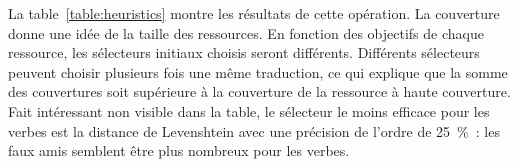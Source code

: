
La table~\ref{table:heuristics} montre les résultats de cette opération. La couverture donne une idée de la taille des ressources. En fonction des objectifs de chaque ressource, les sélecteurs initiaux choisis seront différents. Différents sélecteurs peuvent choisir plusieurs fois une même traduction, ce qui explique que la somme des couvertures soit supérieure à la couverture de la ressource à haute couverture. Fait intéressant non visible dans la table, le sélecteur le moins efficace pour les verbes est la distance de Levenshtein avec une précision de l'ordre de 25~\%~: les faux amis semblent être plus nombreux pour les verbes.

